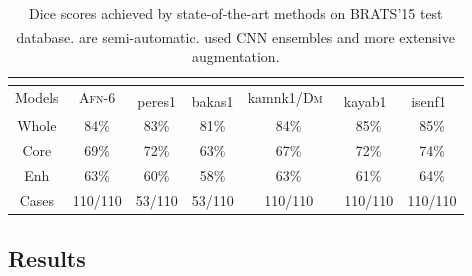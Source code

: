 \documentclass{llncs}
\begin{document}
\begin{table}[]
\centering
\label{tab:brats15_test}
\begin{tabular}{ccccccc}
\multicolumn{7}{c}{} \\
\hline
Models	& \textsc{Afn}-6	& peres1\textsuperscript{\textdagger}\textsuperscript{\textasteriskcentered}\cite{pereira2016brain} 	& bakas1\textsuperscript{\textdagger}\cite{bakas2015glistrboost}    	& kamnk1/\textsc{Dm}~\cite{Kamnitsas2017EfficientM3} & kayab1\textsuperscript{\textasteriskcentered}~\cite{kayalibay2017cnn}  & isenf1\textsuperscript{\textasteriskcentered}~\cite{isensee2017brain}     \\
Whole	& 84\%				& 83\%   							& 81\%		& 84\%  									& 85\%     & 85\%     \\
Core	& 69\%              & 72\%   							& 63\%		& 67\%  									& 72\%     & 74\%   \\

Enh		& 63\%              & 60\% 								& 58\%		& 63\%                                      & 61\%     & 64\%    \\
Cases	& 110/110      		& 53/110 		& 53/110	& 110/110       & 110/110 & 110/110 \\
\hline
\end{tabular}
\caption{Dice scores achieved by state-of-the-art methods on BRATS'15 test database. \textsuperscript{\textdagger} are semi-automatic. \textsuperscript{\textasteriskcentered} used CNN ensembles and more extensive augmentation.}
\vspace{-9mm}
\label{lead}
\end{table}

\vspace{-3mm}
\subsection{Results}
\vspace{-2mm}
\end{document}
